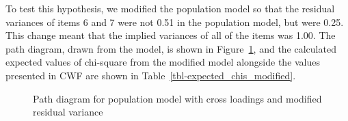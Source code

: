 \documentclass[
  letterpaper,
  DIV=11,
  numbers=noendperiod]{scrartcl}
\begin{document}
To test this hypothesis, we modified the population model so that the
residual variances of items 6 and 7 were not 0.51 in the population
model, but were 0.25. This change meant that the implied variances of
all of the items was 1.00. The path diagram, drawn from the model, is
shown in Figure~\ref{fig-pop_model_new}, and the calculated expected
values of chi-square from the modified model alongside the values
presented in CWF are shown in Table~\ref{tbl-expected_chis_modified}.

\begin{figure}[H]


\caption{\label{fig-pop_model_new}Path diagram for population model with
cross loadings and modified residual variance}

\end{figure}%
\end{document}
